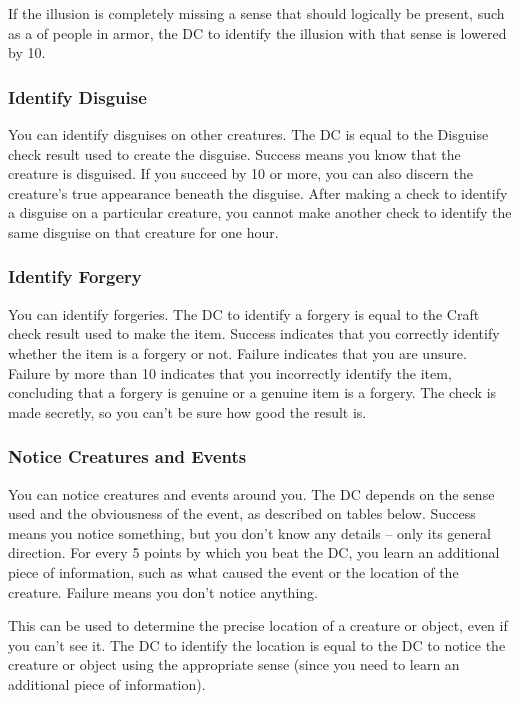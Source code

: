 If the illusion is completely missing a sense that should logically be present, such as a  of people in armor, the DC to identify the illusion with that sense is lowered by 10.

\subsubsection{Identify Disguise}
You can identify disguises on other creatures. The DC is equal to the Disguise check result used to create the disguise. Success means you know that the creature is disguised. If you succeed by 10 or more, you can also discern the creature's true appearance beneath the disguise. After making a check to identify a disguise on a particular creature, you cannot make another check to identify the same disguise on that creature for one hour.

\subsubsection{Identify Forgery}
You can identify forgeries. The DC to identify a forgery is equal to the Craft check result used to make the item. Success indicates that you correctly identify whether the item is a forgery or not. Failure indicates that you are unsure. Failure by more than 10 indicates that you incorrectly identify the item, concluding that a forgery is genuine or a genuine item is a forgery. The check is made secretly, so you can't be sure how good the result is.

\subsubsection{Notice Creatures and Events}
You can notice creatures and events around you. The DC depends on the sense used and the obviousness of the event, as described on tables below. Success means you notice something, but you don't know any details -- only its general direction. For every 5 points by which you beat the DC, you learn an additional piece of information, such as what caused the event or the location of the creature. Failure means you don't notice anything.

This can be used to determine the precise location of a creature or object, even if you can't see it. The DC to identify the location is equal to the DC to notice the creature or object using the appropriate sense  (since you need to learn an additional piece of information).

